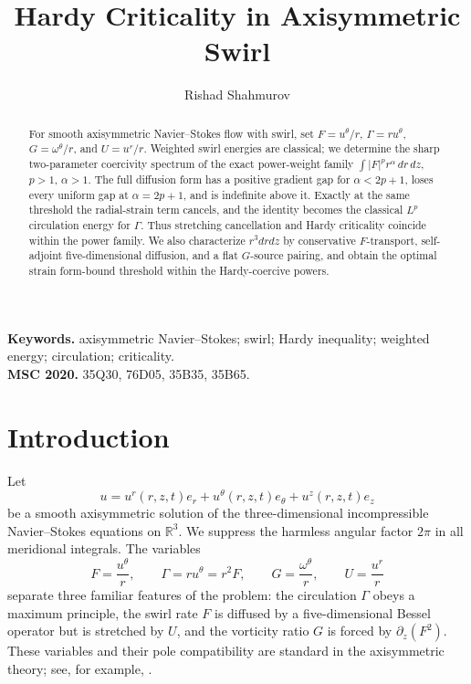 \documentclass[11pt]{article}
\title{\textbf{Hardy Criticality in Axisymmetric Swirl}}
\author{Rishad Shahmurov}
\date{}
\numberwithin{equation}{section}
\theoremstyle{remark}
\newcommand{\R}{\mathbb R}
\begin{document}
\maketitle

\begin{abstract}
For smooth axisymmetric Navier--Stokes flow with swirl, set
\(F=u^\theta/r\), \(\Gamma=ru^\theta\), \(G=\omega^\theta/r\), and \(U=u^r/r\).
Weighted swirl energies are classical; we determine the sharp two-parameter coercivity spectrum of the exact power-weight family
\(\int |F|^p r^\alpha\,dr\,dz\), \(p>1\), \(\alpha>1\).
The full diffusion form has a positive gradient gap for \(\alpha<2p+1\), loses every uniform gap at \(\alpha=2p+1\), and is indefinite above it.  Exactly at the same threshold the radial-strain term cancels, and the identity becomes the classical \(L^p\) circulation energy for \(\Gamma\).  Thus stretching cancellation and Hardy criticality coincide within the power family.  We also characterize \(r^3drdz\) by conservative \(F\)-transport, self-adjoint five-dimensional diffusion, and a flat \(G\)-source pairing, and obtain the optimal strain form-bound threshold within the Hardy-coercive powers.
\end{abstract}

\noindent\textbf{Keywords.} axisymmetric Navier--Stokes; swirl; Hardy inequality; weighted energy; circulation; criticality.\\
\textbf{MSC 2020.} 35Q30, 76D05, 35B35, 35B65.

\section{Introduction}

Let
\[
 u=u^r(r,z,t)e_r+u^\theta(r,z,t)e_\theta+u^z(r,z,t)e_z
\]
be a smooth axisymmetric solution of the three-dimensional incompressible Navier--Stokes equations on \(\R^3\).  We suppress the harmless angular factor \(2\pi\) in all meridional integrals.  The variables
\[
 F=\frac{u^\theta}{r},\qquad \Gamma=ru^\theta=r^2F,
 \qquad G=\frac{\omega^\theta}{r},\qquad U=\frac{u^r}{r}
\]
separate three familiar features of the problem: the circulation \(\Gamma\) obeys a maximum principle, the swirl rate \(F\) is diffused by a five-dimensional Bessel operator but is stretched by \(U\), and the vorticity ratio \(G\) is forced by \(\partial_z(F^2)\).  These variables and their pole compatibility are standard in the axisymmetric theory; see, for example, \cite{ChaeLee2002,LiuWang2009,LeiZhang2017,ChenFangZhang2017,RencZaj2019,WangHuangWeiYu2024}.
\end{document}
